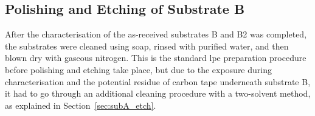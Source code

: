 \subsection{Polishing and Etching of Substrate B}

After the characterisation of the as-received substrates B and B2 was completed, the substrates were cleaned using soap, rinsed with purified water, and then blown dry with gaseous nitrogen. This is the standard \ac{lpe} preparation procedure before polishing and etching take place, but due to the exposure during characterisation and the potential residue of carbon tape underneath substrate B, it had to go through an additional cleaning procedure with a two-solvent method, as explained in Section~\ref{sec:subA_etch}.%

%


